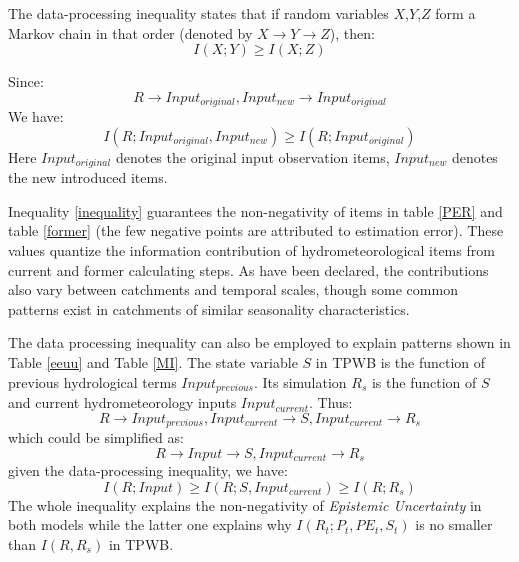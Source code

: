 \documentclass[draft,wrr]{AGUTeX}
\begin{document}
\begin{article}
The data-processing inequality states that if random variables $X$,$Y$,$Z$ form a Markov chain in that order (denoted by $X \rightarrow Y \rightarrow Z$), then:
\begin{equation}
I(X;Y) \geq I(X;Z)
\end{equation}

Since:
\begin{equation}
R \rightarrow Input_{original},Input_{new} \rightarrow Input_{original}
\end{equation} 
We have:
\begin{equation}
\label{inequality}
I(R;Input_{original},Input_{new}) \geq I(R;Input_{original})
\end{equation}
Here $Input_{original}$ denotes the original input observation items, $Input_{new}$ denotes the new introduced items.  

Inequality \ref{inequality} guarantees the non-negativity of items in table \ref{PER} and table \ref{former} (the few negative points are attributed to estimation error).  
These values quantize the information contribution of  hydrometeorological items from current and former calculating steps. As have been declared, the contributions also vary between catchments and temporal scales, though some common patterns exist in catchments of similar seasonality characteristics.

The data processing inequality can also be employed to explain patterns shown in Table \ref{eeuu} and Table \ref{MI}. The state variable $S$ in TPWB is the function of previous hydrological terms $Input_{previous}$. Its simulation $R_s$ is the function of $S$ and current hydrometeorology inputs $Input_{current}$. Thus:
\begin{equation}
R \rightarrow Input_{previous},Input_{current} \rightarrow S,Input_{current} \rightarrow R_s
\end{equation}
which could be simplified  as:
 \begin{equation}
R \rightarrow Input \rightarrow S,Input_{current} \rightarrow R_s
\end{equation}
given the data-processing inequality, we have:
\begin{equation}
\label{ie2}
I(R;Input)\geq I(R;S,Input_{current}) \geq I(R;R_s)
\end{equation}
The whole inequality explains the non-negativity of \emph{Epistemic Uncertainty} in both models while the latter one explains why $I(R_t;P_t,PE_t,S_t)$ is no smaller than $I(R,R_s)$ in TPWB.


\end{article}
\end{document}
